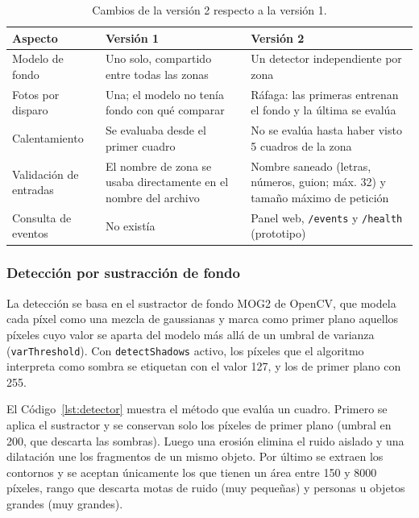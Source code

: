 \documentclass[11pt,a4paper]{article}
\begin{document}
\begin{table}[H]
\centering
\small
\begin{tabular}{>{\raggedright\arraybackslash}p{2.8cm}>{\raggedright\arraybackslash}p{5.4cm}>{\raggedright\arraybackslash}p{5.6cm}}
\toprule
\textbf{Aspecto} & \textbf{Versión 1} & \textbf{Versión 2} \\
\midrule
Modelo de fondo & Uno solo, compartido entre todas las zonas & Un detector independiente por zona \\
Fotos por disparo & Una; el modelo no tenía fondo con qué comparar & Ráfaga: las primeras entrenan el fondo y la última se evalúa \\
Calentamiento & Se evaluaba desde el primer cuadro & No se evalúa hasta haber visto 5 cuadros de la zona \\
Validación de entradas & El nombre de zona se usaba directamente en el nombre del archivo & Nombre saneado (letras, números, guion; máx. 32) y tamaño máximo de petición \\
Consulta de eventos & No existía & Panel web, \texttt{/events} y \texttt{/health} (prototipo) \\
\bottomrule
\end{tabular}
\caption{Cambios de la versión 2 respecto a la versión 1.}
\label{tab:cambios}
\end{table}

\subsubsection*{Detección por sustracción de fondo}

La detección se basa en el sustractor de fondo MOG2 de OpenCV, que modela cada píxel como una mezcla de gaussianas y marca como primer plano aquellos píxeles cuyo valor se aparta del modelo más allá de un umbral de varianza (\texttt{varThreshold}). Con \texttt{detectShadows} activo, los píxeles que el algoritmo interpreta como sombra se etiquetan con el valor 127, y los de primer plano con 255.

El Código~\ref{lst:detector} muestra el método que evalúa un cuadro. Primero se aplica el sustractor y se conservan solo los píxeles de primer plano (umbral en 200, que descarta las sombras). Luego una erosión elimina el ruido aislado y una dilatación une los fragmentos de un mismo objeto. Por último se extraen los contornos y se aceptan únicamente los que tienen un área entre 150 y 8000 píxeles, rango que descarta motas de ruido (muy pequeñas) y personas u objetos grandes (muy grandes).
\end{document}
